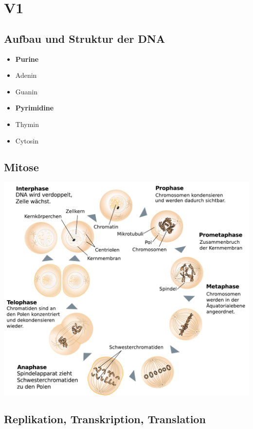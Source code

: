 \section{V1}
\subsection{Aufbau und Struktur der DNA}
        \begin{itemize}
            \item[] \textbf{Purine}
            \item Adenin
            \item Guanin
        \end{itemize}
        \begin{itemize}
            \item[] \textbf{Pyrimidine}
            \item Thymin
            \item Cytosin
        \end{itemize}

\subsection{Mitose}
    \includegraphics[width=1\textwidth]{lectures/V1/pix/Schemazeichnung_Mitose.pdf}\\
    \caption{Zellzyklus mit Mitose\footnote{\url{https://de.wikipedia.org/wiki/Mitose}}}

\subsection{Replikation, Transkription, Translation}

